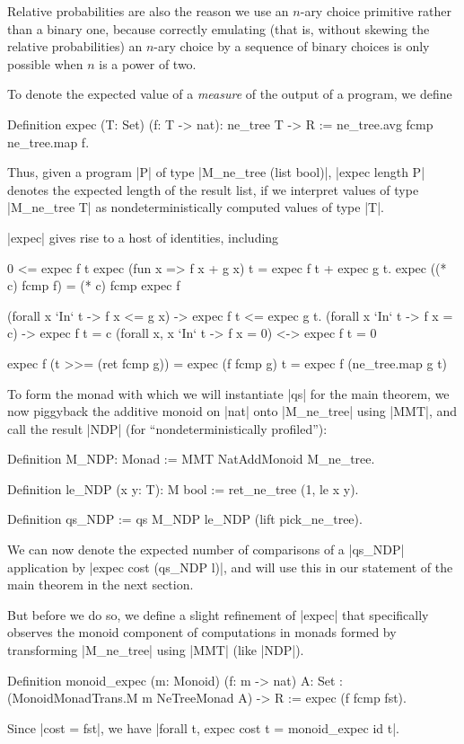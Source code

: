 \documentclass[runningheads]{llncs}
\begin{document}
Relative probabilities are also the reason we use an $n$-ary choice primitive rather than a binary one, because correctly emulating (that is, without skewing the relative probabilities) an $n$-ary choice by a sequence of binary choices is only possible when $n$ is a power of two.

To denote the expected value of a \emph{measure} of the output of a program, we define

\begin{code}
  Definition expec (T: Set) (f: T -> nat): ne_tree T -> R
    := ne_tree.avg fcmp ne_tree.map f.
\end{code}

Thus, given a program |P| of type |M_ne_tree (list bool)|, |expec length P| denotes the expected length of the result list, if we interpret values of type |M_ne_tree T| as nondeterministically computed values of type |T|.

|expec| gives rise to a host of identities, including

\begin{code}
  0 <= expec f t
  expec (fun x => f x + g x) t = expec f t + expec g t.
  expec ((* c) fcmp f) = (* c) fcmp expec f

  (forall x `In` t -> f x <= g x) -> expec f t <= expec g t.
  (forall x `In` t -> f x = c) -> expec f t = c
  (forall x, x `In` t -> f x = 0) <-> expec f t = 0

  expec f (t >>= (ret fcmp g)) = expec (f fcmp g) t = expec f (ne_tree.map g t)
\end{code}

To form the monad with which we will instantiate |qs| for the main theorem, we now piggyback the additive monoid on |nat| onto |M_ne_tree| using |MMT|, and call the result |NDP| (for ``nondeterministically profiled''):
\begin{code}
  Definition M_NDP: Monad := MMT NatAddMonoid M_ne_tree.

  Definition le_NDP (x y: T): M bool := ret_ne_tree (1, le x y).

  Definition qs_NDP := qs M_NDP le_NDP (lift pick_ne_tree).
\end{code}
We can now denote the expected number of comparisons of a |qs_NDP| application by |expec cost (qs_NDP l)|, and will use this in our statement of the main theorem in the next section.

But before we do so, we define a slight refinement of |expec| that specifically observes the monoid component of computations in monads formed by transforming |M_ne_tree| using |MMT| (like |NDP|).
\begin{code}
  Definition monoid_expec (m: Monoid) (f: m -> nat) {A: Set}
    : (MonoidMonadTrans.M m NeTreeMonad A) -> R := expec (f fcmp fst).
\end{code}
Since |cost = fst|, we have |forall t, expec cost t = monoid_expec id t|.
\end{document}
